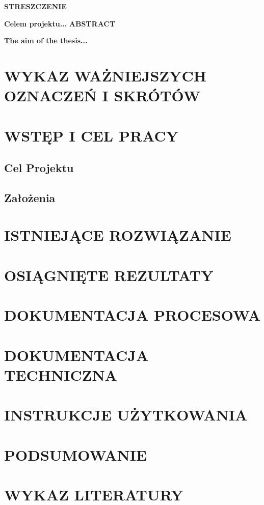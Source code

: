 \documentclass[10pt, a4paper]{article}
\newcommand\emptypage{
    \null
    \thispagestyle{empty}
    \addtocounter{page}{-1}
    \newpage
}
\begin{document}
\emptypage

\Large
\textbf{STRESZCZENIE}

\normalsize
\textbf{
    \newline
    Celem projektu...
}
\newpage
\Large
\textbf{ABSTRACT}

\normalsize
\textbf{
    \newline
    The aim of the thesis...
}
\newpage
\tableofcontents

\newpage
\section*{WYKAZ WAŻNIEJSZYCH OZNACZEŃ I SKRÓTÓW}

\newpage
\section{WSTĘP I CEL PRACY}

\subsection{Cel Projektu}

\subsection{Założenia}

\section{ISTNIEJĄCE ROZWIĄZANIE}

\section{OSIĄGNIĘTE REZULTATY}

\section{DOKUMENTACJA PROCESOWA}

\section{DOKUMENTACJA TECHNICZNA}

\section{INSTRUKCJE UŻYTKOWANIA}

\section{PODSUMOWANIE}

\section{WYKAZ LITERATURY}

\newpage
\listoffigures{}

\newpage
\listoftables{}
\end{document}
